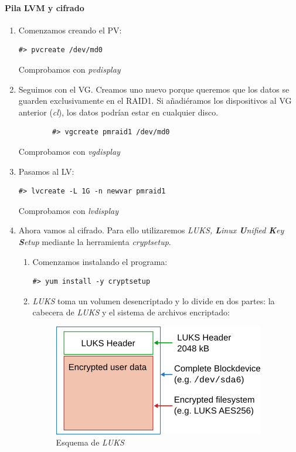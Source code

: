 \documentclass[12pt,spanish]{article}
\begin{document}
\paragraph{Pila LVM y cifrado}
\begin{enumerate}
	\item Comenzamos creando el PV:
		\begin{lstlisting}[xleftmargin=-1.5cm]
			#> pvcreate /dev/md0
		\end{lstlisting}
	Comprobamos con \textit{pvdisplay}
	\item Seguimos con el VG. Creamos uno nuevo porque queremos que los datos se guarden exclusivamente en el RAID1. Si añadiéramos los dispositivos al VG anterior (\textit{cl}), los datos podrían estar en cualquier disco.
	\begin{lstlisting}
		#> vgcreate pmraid1 /dev/md0
	\end{lstlisting}
	Comprobamos con \textit{vgdisplay}
	\item Pasamos al LV:
		\begin{lstlisting}[xleftmargin=-1.5cm]
			#> lvcreate -L 1G -n newvar pmraid1
		\end{lstlisting}
	Comprobamos con \textit{lvdisplay}
	\item Ahora vamos al cifrado. Para ello utilizaremos \textit{LUKS, \textbf{L}inux \textbf{U}nified \textbf{K}ey \textbf{S}etup} mediante la herramienta \textit{cryptsetup}.
	\begin{enumerate}
		\item Comenzamos instalando el programa:
			\begin{lstlisting}[xleftmargin=-3.8cm]
				#> yum install -y cryptsetup
			\end{lstlisting}
			\item \textit{LUKS} toma un volumen desencriptado y lo divide en dos partes: la cabecera de \textit{LUKS} y el sistema de archivos encriptado:
			\begin{figure}[H]
				\centering
				\includegraphics{luks.png}
				\caption{Esquema de \textit{LUKS}}

\end{figure}
\end{enumerate}
\end{enumerate}
\end{document}
